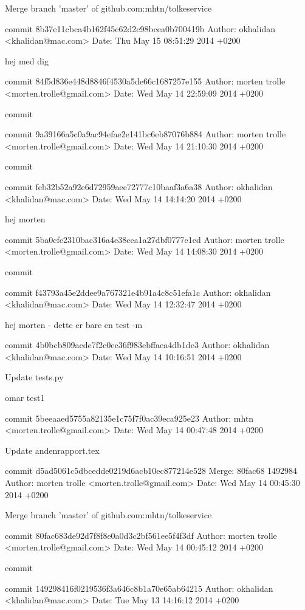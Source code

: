 \documentclass[12pt]{article}   %
\begin{document}
    Merge branch 'master' of github.com:mhtn/tolkeservice

commit 8b37e11cbca4b162f45c62d2c98bcea0b700419b
Author: okhalidan <khalidan@mac.com>
Date:   Thu May 15 08:51:29 2014 +0200

    hej med dig

commit 84f5d836e448d8846f4530a5de66c1687257e155
Author: morten trolle <morten.trolle@gmail.com>
Date:   Wed May 14 22:59:09 2014 +0200

    commit

commit 9a39166a5c0a9ac94efae2e141bc6eb87076b884
Author: morten trolle <morten.trolle@gmail.com>
Date:   Wed May 14 21:10:30 2014 +0200

    commit

commit feb32b52a92e6d72959aee72777c10baaf3a6a38
Author: okhalidan <khalidan@mac.com>
Date:   Wed May 14 14:14:20 2014 +0200

    hej morten

commit 5ba0cfc2310bac316a4e38cca1a27dbf0777e1ed
Author: morten trolle <morten.trolle@gmail.com>
Date:   Wed May 14 14:08:30 2014 +0200

    commit

commit f43793a45e2ddee9a767321e4b91a4c8c51efa1c
Author: okhalidan <khalidan@mac.com>
Date:   Wed May 14 12:32:47 2014 +0200

    hej morten - dette er bare en test -m

commit 4b0bcb809acde7f2c0ec36f983ebffaea4db1de3
Author: okhalidan <khalidan@mac.com>
Date:   Wed May 14 10:16:51 2014 +0200

    Update tests.py
    
    omar test1

commit 5beeaaed5755a82135e1c75f7f0ac39eca925e23
Author: mhtn <morten.trolle@gmail.com>
Date:   Wed May 14 00:47:48 2014 +0200

    Update andenrapport.tex

commit d5ad5061c5dbcedde0219d6acb10ec877214e528
Merge: 80fac68 1492984
Author: morten trolle <morten.trolle@gmail.com>
Date:   Wed May 14 00:45:30 2014 +0200

    Merge branch 'master' of github.com:mhtn/tolkeservice

commit 80fac683de92d7f8f8e0a0d3c2bf561ee5f4f3df
Author: morten trolle <morten.trolle@gmail.com>
Date:   Wed May 14 00:45:12 2014 +0200

    commit

commit 149298416f0219536f3a646c8b1a70e65ab64215
Author: okhalidan <khalidan@mac.com>
Date:   Tue May 13 14:16:12 2014 +0200
\end{document}
